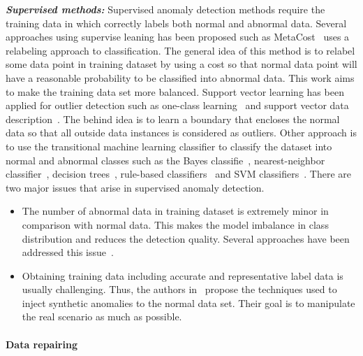 \textbf{\textit{Supervised methods: }} Supervised anomaly detection methods require the training data in which correctly labels both normal and abnormal data. Several approaches using supervise leaning has been proposed such as MetaCost~\cite{domingos1999metacost} uses a relabeling approach to classification. The general idea of this method is to relabel some data point in training dataset by using a cost so that normal data point will have a reasonable probability to be classified into abnormal data. This work aims to make the training data set more balanced. Support vector learning has been applied for outlier detection such as one-class learning~\cite{scholkopf2001learning} and support vector data description~\cite{tax2004support}. The behind idea is to learn a boundary that encloses the normal data so that all outside data instances is considered as outliers. Other approach is to use the transitional machine learning classifier to classify the dataset into normal and abnormal classes such as the Bayes classifie~\cite{zadrozny2003cost}, nearest-neighbor classifier~\cite{mani2003knn}, decision trees~\cite{ting2002instance}\cite{weiss2003learning}, rule-based classifiers~\cite{joshi2001mining}\cite{juszczak2003uncertainty} and SVM classifiers~\cite{tang2009svms}\cite{wu2003class}. There are two major issues that arise in supervised anomaly detection. 
\begin{itemize}
    \item The number of abnormal data in training dataset is extremely minor in comparison with normal data. This makes the model imbalance in class distribution and reduces the detection quality. Several approaches have been addressed this issue~\cite{joshi2001computational}\cite{chawla2004special}\cite{phua2004minority}.
    \item Obtaining training data including accurate and representative label data is usually challenging. Thus, the authors in~\cite{theiler2003resampling}\cite{steinwart2005classification} propose the techniques used to inject synthetic anomalies to the normal data set. Their goal is to manipulate the real scenario as much as possible. 
\end{itemize}

\paragraph{Data repairing }


